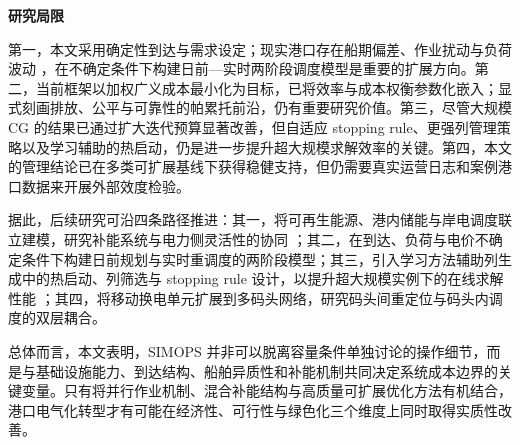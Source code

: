 \documentclass[UTF8, a4paper, 12pt]{ctexart}
\theoremstyle{plain}
\theoremstyle{definition}
\theoremstyle{remark}
\begin{document}
\textbf{研究局限}

第一，本文采用确定性到达与需求设定；现实港口存在船期偏差、作业扰动与负荷波动 \citep{UNCTAD2021}，在不确定条件下构建日前—实时两阶段调度模型是重要的扩展方向。第二，当前框架以加权广义成本最小化为目标，已将效率与成本权衡参数化嵌入；显式刻画排放、公平与可靠性的帕累托前沿，仍有重要研究价值。第三，尽管大规模 CG 的结果已通过扩大迭代预算显著改善，但自适应 stopping rule、更强列管理策略以及学习辅助的热启动，仍是进一步提升超大规模求解效率的关键。第四，本文的管理结论已在多类可扩展基线下获得稳健支持，但仍需要真实运营日志和案例港口数据来开展外部效度检验。

据此，后续研究可沿四条路径推进：其一，将可再生能源、港内储能与岸电调度联立建模，研究补能系统与电力侧灵活性的协同 \cite{Li2022_BSS}；其二，在到达、负荷与电价不确定条件下构建日前规划与实时重调度的两阶段模型；其三，引入学习方法辅助列生成中的热启动、列筛选与 stopping rule 设计，以提升超大规模实例下的在线求解性能 \cite{Bengio2021}；其四，将移动换电单元扩展到多码头网络，研究码头间重定位与码头内调度的双层耦合。

总体而言，本文表明，SIMOPS 并非可以脱离容量条件单独讨论的操作细节，而是与基础设施能力、到达结构、船舶异质性和补能机制共同决定系统成本边界的关键变量。只有将并行作业机制、混合补能结构与高质量可扩展优化方法有机结合，港口电气化转型才有可能在经济性、可行性与绿色化三个维度上同时取得实质性改善。

\FloatBarrier


\end{document}

